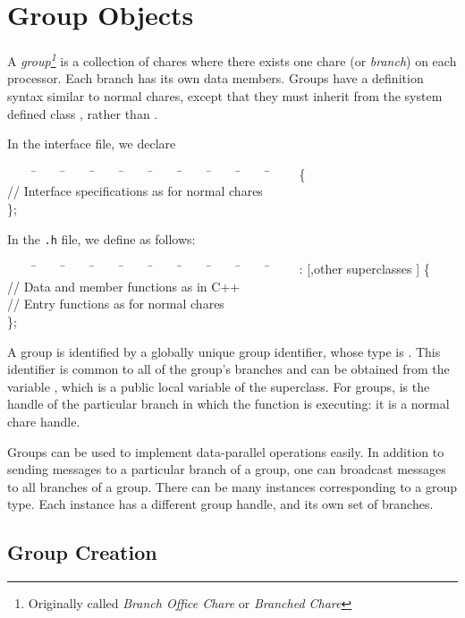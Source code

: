 \section{Group Objects}

A {\sl group\footnote{Originally called {\em Branch Office Chare} or 
{\em Branched Chare}}} is a collection of chares where 
there exists one chare (or {\sl branch}) on each
processor.   Each branch has its own data members.  Groups have
a definition syntax similar to normal chares, except that they must
inherit from the system defined class , rather than
.

In the interface file, we declare

\begin{tabbing}
~~~~ \=~~~~ \=~~~~ \=~~~~ \=~~~~ \=~~~~ \=~~~~ \=~~~~ \=~~~~ \=~~~~ \kill
\>   \{ \\
\> \>  // Interface specifications as for normal chares \\
\> \};
\end{tabbing}

In the {\tt .h} file, we define  as follows:

\begin{tabbing}
~~~~ \=~~~~ \=~~~~ \=~~~~ \=~~~~ \=~~~~ \=~~~~ \=~~~~ \=~~~~ \=~~~~ \kill
\>   :  [,other superclasses
] \{ \\
\> \> // Data and member functions as in C++ \\
\> \> // Entry functions as for normal chares \\
\> \};
\end{tabbing}

A group is identified by a globally unique group identifier, whose type is
. This identifier is common to all of the 
group's branches and can be obtained from the variable ,
 which is a public local variable of the  
superclass.  For groups,  is the handle of 
the particular branch in which the function is executing: it is 
a normal chare handle.

Groups can be used to implement data-parallel operations easily.  In
addition to sending messages to a particular branch of a group, one
can broadcast messages to all branches of a group.  There can be many
instances corresponding to a group type.  Each instance has a
different group handle, and its own set of branches.

\subsection{Group Creation}

